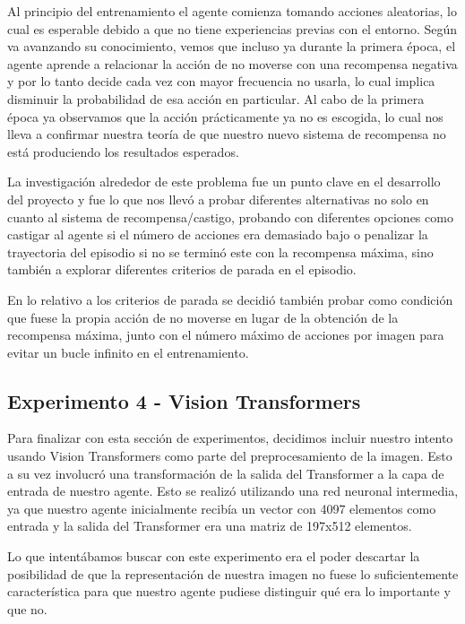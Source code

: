 

Al principio del entrenamiento el agente comienza tomando acciones aleatorias, lo cual es esperable debido a que no tiene experiencias previas con el entorno. Según va avanzando su conocimiento, vemos que incluso ya durante la primera época, el agente aprende a relacionar la acción de no moverse con una recompensa negativa y por lo tanto decide cada vez con mayor frecuencia no usarla, lo cual implica disminuir la probabilidad de esa acción en particular. Al cabo de la primera época ya observamos que la acción prácticamente ya no es escogida, lo cual nos lleva a confirmar nuestra teoría de que nuestro nuevo sistema de recompensa no está produciendo los resultados esperados.
\medskip

La investigación alrededor de este problema fue un punto clave en el desarrollo del proyecto y fue lo que nos llevó a probar diferentes alternativas no solo en cuanto al sistema de recompensa/castigo, probando con diferentes opciones como castigar al agente si el número de acciones era demasiado bajo o penalizar la trayectoria del episodio si no se terminó este con la recompensa máxima, sino también a explorar diferentes criterios de parada en el episodio.
\medskip

En lo relativo a los criterios de parada se decidió también probar como condición que fuese la propia acción de no moverse en lugar de la obtención de la recompensa máxima, junto con el número máximo de acciones por imagen para evitar un bucle infinito en el entrenamiento.
\medskip


\subsection{Experimento 4 - Vision Transformers}
\label{resultados-actor-critic-vision-transformers}

Para finalizar con esta sección de experimentos, decidimos incluir nuestro intento usando Vision Transformers como parte del preprocesamiento de la imagen. Esto a su vez involucró una transformación de la salida del Transformer a la capa de entrada de nuestro agente. Esto se realizó utilizando una red neuronal intermedia, ya que nuestro agente inicialmente recibía un vector con 4097 elementos como entrada y la salida del Transformer era una matriz de 197x512 elementos.
\medskip

Lo que intentábamos buscar con este experimento era el poder descartar la posibilidad de que la representación de nuestra imagen no fuese lo suficientemente característica para que nuestro agente pudiese distinguir qué era lo importante y que no. 
\medskip

